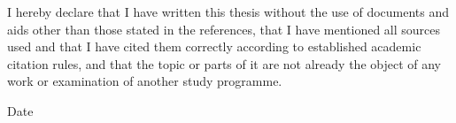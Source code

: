 I hereby declare that I have written this thesis without the use of documents and aids other than those stated in the references, that I have mentioned all sources used and that I have cited them correctly according to established academic citation rules, and that the topic or parts of it are not already the object of any work or examination of another study programme.

\vspace{4cm}

Date \hspace{\fill} \makeatletter\@author\makeatother \\
